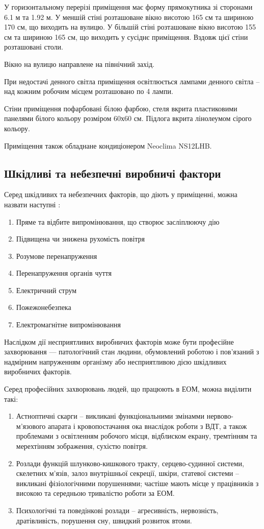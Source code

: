 \documentclass[a4paper,12pt]{article}
\begin{document}
У горизонтальному перерізі приміщення має форму прямокутника зі сторонами 6.1 м та 1.92 м. У меншій стіні розташоване вікно висотою 165 см та шириною 170 см, що виходить на вулицю. У більшій стіні розташоване вікно  висотою 155 см та шириною 165 см, що виходить у сусіднє приміщення. Вздовж цієї стіни розташовані столи.

Вікно на вулицю направлене на північний захід.

При недостачі денного світла приміщення освітлюється лампами денного світла -- над кожним робочим місцем розташовано по 4 лампи.

Стіни приміщення пофарбовані білою фарбою, стеля вкрита пластиковими панелями білого кольору розміром 60х60 см. Підлога вкрита лінолеумом сірого кольору.

Приміщення також обладнане кондиціонером Neoclima NS12LHB.

\subsection{Шкідливі та небезпечні виробничі фактори}
Серед шкідливих та небезпечних факторів, що діють у приміщенні, можна назвати наступні \cite{gost_fact}:
\begin{enumerate}
\item Пряме та відбите випромінювання, що створює засліплюючу дію
\item Підвищена чи знижена рухомість повітря
\item Розумове перенапруження
\item Перенапруження органів чуття
\item Електричний струм
\item Пожежонебезпека
\item Електромагнітне випромінювання
\end{enumerate}

Наслідком дії несприятливих виробничих факторів може бути професійне захворювання — патологічний стан людини, обумовлений роботою і пов’язаний з надмірним напруженням організму або несприятливою дією шкідливих виробничих факторів.

Серед професійних захворювань людей, що працюють в ЕОМ, можна виділити такі:
\begin{enumerate}
\item Астноптичні скарги -- викликані функціональними змінамми нервово-м’язового апарата і кровопостачання ока внаслідок роботи з ВДТ, а також проблемами з освітленням робочого місця, відблиском екрану, тремтінням та мерехтінням зображення, сухістю повітря.
\item Розлади функцій шлунково-кишкового тракту, серцево-судинної системи, скелетних м’язів, залоз внутрішньої секреції, шкіри, статевої системи -- викликані фізіологічними порушеннями; частіше мають місце у працівників з високою та середньою тривалістю роботи за ЕОМ.
\item Психологічні та поведінкові розлади -- агресивність, нервозність, дратівливість, порушення сну, швидкий розвиток втоми.
\end{enumerate}
\end{document}
